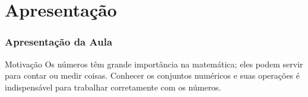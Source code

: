 
\section{Apresentação}

\frame
{
\frametitle{Apresentação da Aula}
\begin{block}{Motivação}
\justifying
		Os números têm grande importância na matemática; eles podem
		servir para contar ou medir coisas. Conhecer os conjuntos
		numéricos e suas operações é indispensável para trabalhar
		corretamente com os números.
 \end{block}
}


